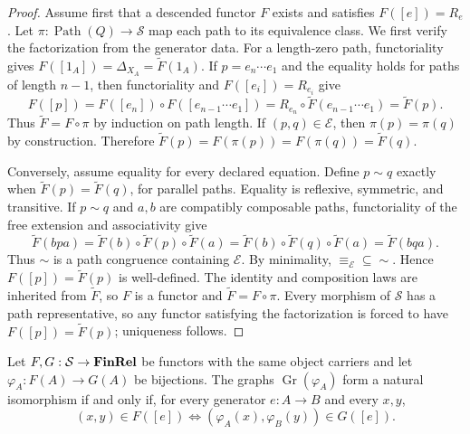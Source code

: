 \begin{proof}
Assume first that a descended functor $F$ exists and satisfies
$F([e])=R_e$. Let
$\pi:\operatorname{Path}(Q)\to\mathcal S$ map each path to its
equivalence class. We first verify the factorization from the generator data.
For a length-zero path, functoriality gives
$F([1_A])=\Delta_{X_A}=\widetilde F(1_A)$. If
$p=e_n\cdots e_1$ and the equality holds for paths of length $n-1$, then
functoriality and $F([e_i])=R_{e_i}$ give
\[
 F([p])=F([e_n])\circ F([e_{n-1}\cdots e_1])
 =R_{e_n}\circ\widetilde F(e_{n-1}\cdots e_1)=\widetilde F(p).
\]
Thus $\widetilde F=F\circ\pi$ by induction on path length. If
$(p,q)\in\mathcal E$, then
$\pi(p)=\pi(q)$ by construction. Therefore
$\widetilde F(p)=F(\pi(p))=F(\pi(q))=\widetilde F(q)$.

Conversely, assume equality for every declared equation. Define
$p\sim q$ exactly when $\widetilde F(p)=\widetilde F(q)$, for parallel
paths. Equality is reflexive, symmetric, and transitive. If $p\sim q$ and
$a,b$ are compatibly composable paths, functoriality of the free extension and
associativity give
\[
 \widetilde F(bpa)
 =\widetilde F(b)\circ\widetilde F(p)\circ\widetilde F(a)
 =\widetilde F(b)\circ\widetilde F(q)\circ\widetilde F(a)
 =\widetilde F(bqa).
\]
Thus $\sim$ is a path congruence containing $\mathcal E$. By minimality,
$\equiv_{\mathcal E}\subseteq\sim$. Hence
$F([p])=\widetilde F(p)$ is well-defined. The identity and composition laws
are inherited from $\widetilde F$, so $F$ is a functor and
$\widetilde F=F\circ\pi$. Every morphism of $\mathcal S$ has a path
representative, so any functor satisfying the factorization is forced to have
$F([p])=\widetilde F(p)$; uniqueness follows.
\end{proof}

\begin{proposition}
Let $F,G:\mathcal S\to\mathbf{FinRel}$ be functors with the same object
carriers and let $\varphi_A:F(A)\to G(A)$ be bijections.
The graphs $\operatorname{Gr}(\varphi_A)$ form a natural isomorphism if and
only if, for every generator $e:A\to B$ and every $x,y$,
\[
 (x,y)\in F([e])
 \Longleftrightarrow
 (\varphi_A(x),\varphi_B(y))\in G([e]).
\]
\end{proposition}

